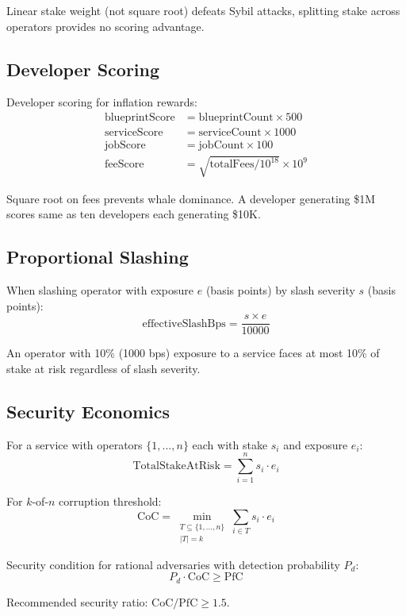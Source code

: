 \documentclass[11pt,a4paper]{article}
\begin{document}
Linear stake weight (not square root) defeats Sybil attacks, splitting stake across operators provides no scoring advantage.

\subsection{Developer Scoring}

Developer scoring for inflation rewards:
\begin{align*}
\text{blueprintScore} &= \text{blueprintCount} \times 500 \\
\text{serviceScore} &= \text{serviceCount} \times 1000 \\
\text{jobScore} &= \text{jobCount} \times 100 \\
\text{feeScore} &= \sqrt{\text{totalFees} / 10^{18}} \times 10^9
\end{align*}

Square root on fees prevents whale dominance. A developer generating \$1M scores same as ten developers each generating \$10K.

\subsection{Proportional Slashing}

When slashing operator with exposure $e$ (basis points) by slash severity $s$ (basis points):
\[
\text{effectiveSlashBps} = \frac{s \times e}{10000}
\]

An operator with 10\% (1000 bps) exposure to a service faces at most 10\% of stake at risk regardless of slash severity.

\subsection{Security Economics}

For a service with operators $\{1, ..., n\}$ each with stake $s_i$ and exposure $e_i$:
\[
\text{TotalStakeAtRisk} = \sum_{i=1}^{n} s_i \cdot e_i
\]

For $k$-of-$n$ corruption threshold:
\[
\text{CoC} = \min_{\substack{T \subseteq \{1,...,n\} \\ |T| = k}} \sum_{i \in T} s_i \cdot e_i
\]

Security condition for rational adversaries with detection probability $P_d$:
\[
P_d \cdot \text{CoC} \geq \text{PfC}
\]

Recommended security ratio: $\text{CoC} / \text{PfC} \geq 1.5$.
\end{document}
